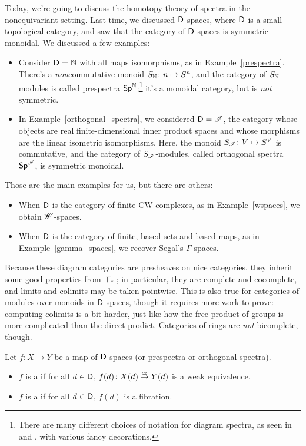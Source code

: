 Today, we're going to discuss the homotopy theory of spectra in the nonequivariant setting. Last time, we discussed
$\mathsf D$-spaces, where $\mathsf D$ is a small topological category, and saw that the category of $\mathsf D$-spaces is symmetric
monoidal. We discussed a few examples:
\begin{itemize}
	\item Consider $\mathsf D = \mathbb N$ with all maps isomorphisms, as in Example~\ref{prespectra}. There's a
	\emph{non}commutative monoid $S_\N\colon n\mapsto S^n$, and the category of $S_\mathbb N$-modules is called prespectra
	$\mathsf{Sp}^\mathbb N$;\footnote{There are many different choices of notation for diagram spectra, as seen in~\cite{MMSS}
	and \cite{MandellMay}, with various fancy decorations.} it's a monoidal category, but is \emph{not} symmetric.
	\item In Example~\ref{orthogonal_spectra}, we considered $\mathsf D = \mathscr I$, the category whose objects are real
	finite-dimensional inner product spaces and whose morphisms are the linear isometric isomorphisms. Here, the
	monoid $S_\sI\colon V\mapsto S^V$ is commutative, and the category of $S_\mathscr I$-modules, called orthogonal
	spectra $\mathsf{Sp}^\mathscr I$, is symmetric monoidal.
\end{itemize}
Those are the main examples for us, but there are others:
\begin{itemize}
	\item When $\mathsf D$ is the category of finite CW complexes, as in Example~\ref{wspaces}, we obtain $\mathscr W$-spaces.
	\item When $\mathsf D$ is the category of finite, based sets and based maps, as in Example~\ref{gamma_spaces}, we
	recover Segal's $\Gamma$-spaces.
\end{itemize}
Because these diagram categories are presheaves on nice categories, they inherit some good properties from $\Top_*$;
in particular, they are complete and cocomplete, and limits and colimits may be taken pointwise. This is also true
for categories of modules over monoids in $\mathsf D$-spaces, though it requires more work to prove: computing colimits
is a bit harder, just like how the free product of groups is more complicated than the direct prodict. Categories
of rings are \emph{not} bicomplete, though.
\begin{defn}
Let $f\colon X\to Y$ be a map of $\mathsf D$-spaces (or prespectra or orthogonal spectra).
\begin{itemize}
	\item $f$ is a  if for all $d\in\mathsf D$, $f(d)\colon X(d)\stackrel\simeq\to Y(d)$ is a weak
	equivalence.
	\item $f$ is a  if for all $d\in\mathsf D$, $f(d)$ is a fibration.
\end{itemize}
\end{defn}
